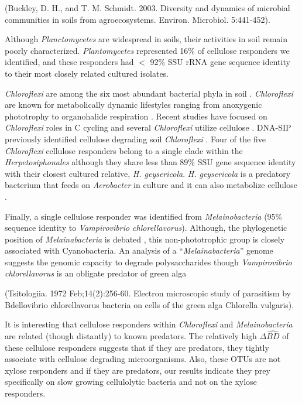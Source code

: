 (Buckley, D. H., and T. M. Schmidt. 2003. Diversity and dynamics of microbial
communities in soils from agroecosystems. Environ. Microbiol.
      5:441-452). 
      
Although \textit{Planctomycetes} are widespread in soils, their activities in
soil remain poorly characterized. \textit{Plantomycetes} represented 16\% of
cellulose responders we identified, and these responders had $<$ 92\% SSU rRNA
gene sequence identity to their most closely related cultured isolates.

\textit{Chloroflexi} are among the six most abundant bacterial phyla in
soil \citep{Janssen2006}. \textit{Chloroflexi} are known for
metabolically dynamic lifestyles ranging from anoxygenic phototrophy to
organohalide respiration \citep{Hug_2013}. Recent studies have focused on
\textit{Chloroflexi} roles in C cycling
\citep{Hug_2013,Goldfarb_2011,Cole_2013} and several \textit{Chloroflexi}
utilize cellulose \citep{Hug_2013,Goldfarb_2011,Cole_2013}. DNA-SIP previously
identified cellulose degrading soil \textit{Chloroflexi}
\citep{Schellenberger_2010}. Four of the five \textit{Chloroflexi}
cellulose responders belong to a single clade within the
\textit{Herpetosiphonales} although they share less than 89\% SSU gene sequence
identity with their closest cultured relative, \textit{H. geysericola}.
\textit{H. geysericola} is a predatory bacterium that feeds on
\textit{Aerobacter} in culture and it can also metabolize cellulose
\citep{Lewin1970}. 

Finally, a single cellulose responder was identified from
\textit{Melainobacteria} (95\% sequence identity to \textit{Vampirovibrio
chlorellavorus}). Although, the phylogenetic position of
\textit{Melainabacteria} is debated \citep{Soo_2014}, this non-phototrophic
group is closely associated with Cyanobacteria. An analysis of
a ``\textit{Melainabacteria}'' genome \citep{Di_Rienzi_2013} suggests the genomic capacity
to degrade polysaccharides though \textit{Vampirovibrio chlorellavorus} is
an obligate predator of green alga

(Tsitologiia. 1972 Feb;14(2):256-60. Electron microscopic study of parasitism
by Bdellovibrio chlorellavorus bacteria on cells of the green alga Chlorella
vulgaris). 

It is interesting that cellulose responders within \textit{Chloroflexi} and
\textit{Melainobacteria} are related (though distantly) to known predators. The
relatively high $\Delta\hat{BD}$ of these cellulose responders suggests that if
they are predators, they tightly associate with cellulose degrading
microorganisms. Also, these OTUs are not xylose responders and if they are
predators, our results indicate they prey specifically on slow growing
cellulolytic bacteria and not on the xylose responders. 

